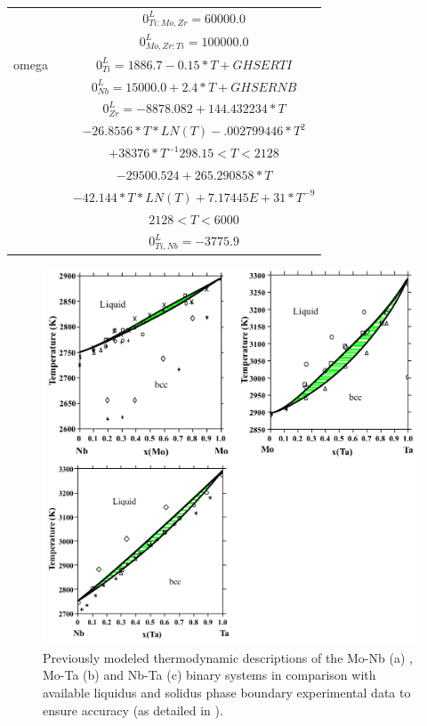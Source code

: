 \begin{longtable}[H]{ c c c }
                               & \cite{Kar2008} & $0^\textit{L}_{Ti:Mo,Zr} = 60000.0$\\
                               & \cite{Kar2008} & $0^\textit{L}_{Mo,Zr:Ti} = 100000.0$\\
                  omega & \cite{Zhang2001} & $0^\textit{L}_{Ti} = 1886.7-0.15*T+GHSERTI$\\
                               & \cite{Zhang2001} &$0^\textit{L}_{Nb} = 15000.0+2.4*T+GHSERNB$\\
                               & \cite{Dinsdale1991} & $0^\textit{L}_{Zr} = -8878.082+144.432234*T$\\
                               &                               & $-26.8556*T*LN(T)-.002799446*T^{2}$\\                      
                               &      & $+38376*T^{-1}    298.15 < T < 2128$\\
                               &      & $-29500.524+265.290858*T$\\
                               &      & $-42.144*T*LN(T)+7.17445E+31*T^{-9}$\\          
                               &      &  $2128 < T< 6000$\\
                               & \cite{Zhang2001} & $0^\textit{L}_{Ti,Nb} = -3775.9$\\
\end{longtable}



\newpage
\begin{figure}[H]
	\centering
	\includegraphics[width=\textwidth]{Chapter-3/Figures/binary1.png}
	\caption{Previously modeled thermodynamic descriptions of the Mo-Nb (a) \cite{Xiong2004}, Mo-Ta (b) \cite{Xiong2004} and Nb-Ta (c) \cite{Xiong2004} binary systems in comparison with available liquidus and solidus phase boundary experimental data to ensure accuracy (as detailed in \cite{Xiong2004}). }
	\label{Ch3-figure:binary1}
\end{figure}

